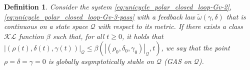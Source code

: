 \documentclass[letterpaper, 10 pt, conference]{ieeeconf}  %
\newtheorem{definition}{Definition}
\begin{document}

\begin{definition}
\label{def-our-GAS}
Consider the system \eqref{eq:unicycle_polar_closed_loop-Gv-2}, \eqref{eq:unicycle_polar_closed_loop-Gv-3-pass} with a feedback law $\tilde\omega(\gamma,\delta)$ that is continuous on a state space $\mathcal{Q}$ with respect to its metric. 
If there exists a class $\mathcal{KL}$ function $\beta$ such that, for all $t\geq 0$, it holds that $|(\rho(t),\delta(t), \gamma(t))|_{\mathcal{Q}}\leq \beta\left(|(\rho_0,\delta_0, \gamma_0)|_{\mathcal{Q}},t\right)$, we say that the 
point $\rho=\delta = \gamma=0$ is {\em globally asymptotically stable on $\mathcal{Q}$} (GAS on $\mathcal{Q}$). 
\end{definition}
\end{document}
